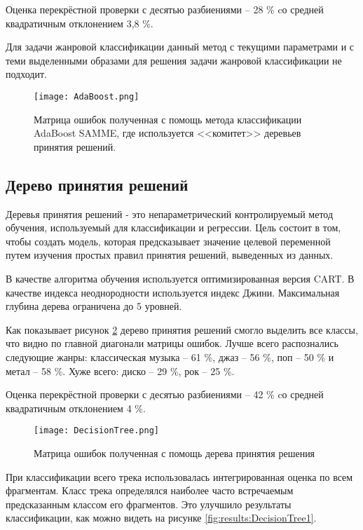 Оценка перекрёстной проверки с десятью разбиениями -- 28 \% cо средней квадратичным отклонением 3,8 \%.  

Для задачи жанровой классификации данный метод с текущими параметрами и с теми выделенными образами для решения задачи жанровой классификации не подходит. 

\begin{figure}[h]
\centering
  \texttt{[image: AdaBoost.png]}
  \caption{Матрица ошибок полученная с помощь метода классификации AdaBoost SAMME, где используется <<комитет>>  деревьев принятия решений.}
  \label{fig:results:adaboost}
\end{figure}

\subsection{Дерево принятия решений}

Деревья принятия решений - это непараметрический контролируемый метод обучения, используемый для классификации и регрессии. Цель состоит в том, чтобы создать модель, которая предсказывает значение целевой переменной путем изучения простых правил принятия решений, выведенных из данных.

В качестве алгоритма обучения используется оптимизированная версия CART. В качестве индекса неоднородности используется индекс Джини. Максимальная глубина дерева ограничена до 5 уровней.

Как показывает рисунок \ref{fig:results:DecisionTree} дерево принятия решений смогло выделить все классы, что видно по главной диагонали матрицы ошибок. Лучше всего распознались следующие жанры: классическая музыка -- 61 \%, джаз -- 56 \%, поп -- 50 \% и метал -- 58 \%. Хуже всего: диско -- 29 \%, рок -- 25 \%. 


Оценка перекрёстной проверки с десятью разбиениями -- 42 \% cо средней квадратичным отклонением 4 \%.  

\begin{figure}[h]
\centering
  \texttt{[image: DecisionTree.png]}
  \caption{Матрица ошибок полученная с помощь дерева принятия решения}
  \label{fig:results:DecisionTree}
\end{figure}

При классификации всего трека использовалась интегрированная оценка по всем фрагментам. Класс трека определялся наиболее часто встречаемым предсказанным классом его фрагментов. Это улучшило результаты классификации, как можно видеть на рисунке
\ref{fig:results:DecisionTree1}. 

